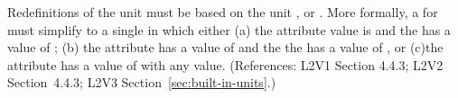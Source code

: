 Redefinitions of the  unit  must be based on
the unit ,  or .
More formally, a \UnitDefinition for  must simplify to a
single \Unit in which either (a) the 
attribute value is  and the  has a value of
; (b) the  attribute has a value of
 and the the  has a value of , or (c)the
 attribute has a value of  with
any  value.  (References: L2V1 Section 4.4.3; L2V2
Section~4.4.3; L2V3 Section~\ref{sec:built-in-units}.)
